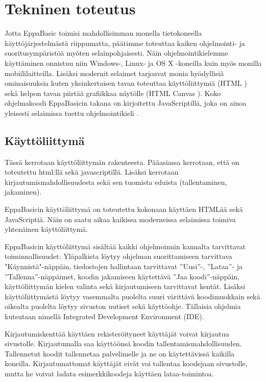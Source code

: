 
\section{Tekninen toteutus}

Jotta EppaBasic toimisi mahdollisimman monella tietokoneella käyttöjärjestelmästä riippumatta,
päätimme toteuttaa kaiken ohjelmointi- ja suoritusympäristöä myöten selainpohjaisesti.
Näin ohjelmointikielemme käyttäminen onnistuu niin Windows-, Linux- ja OS X -koneilla
kuin myös monilla mobiililaitteilla.
Lisäksi modernit selaimet tarjoavat monia hyödyllisiä ominaisuuksia
kuten yksinkertaisen tavan toteuttaa käyttöliittymiä (HTML \cite{w3c_html})
sekä helpon tavan piirtää grafiikkaa näytölle (HTML Canvas \cite{mdn_canvas}).
Koko ohjelmakoodi EppaBasicin takana on kirjoitettu JavaScriptillä,
joka on ainoa yleisesti selaimissa tuettu ohjelmointikieli \cite{mdn_about_js}.

\subsection{Käyttöliittymä}
\begin{anfxnote}{}
Tässä kerrotaan käyttöliittymän rakenteesta.
Pääasiassa kerrotaan, että on toteutettu html:llä sekä javascriptillä.
Lisäksi kerrotaan kirjautumismahdollisuudesta sekä
sen tuomista eduista (tallentaminen, jakaminen).
\end{anfxnote}

EppaBasicin käyttöliittymä on toteutettu kokonaan käyttäen HTMLää sekä JavaScriptiä.
Näin on saatu aikaa kaikissa moderneissa selaimissa toimiva yhtenäinen käyttöliittymä.

EppaBasicin käyttöliittymä sisältää kaikki ohjelmoinnin kannalta tarvittavat toiminnallisuudet:
Yläpalkista löytyy ohjelman suorittamiseen tarvittava "Käynnistä"-näppäin,
tiedostojen hallintaan tarvittavat ''Uusi''-, ''Lataa''- ja ''Tallenna''-näppäimet,
koodin jakamiseen käytettävä ''Jaa koodi''-näppäin,
käyttöliittymän kielen valinta
sekä kirjautumiseen tarvittavat kentät.
Lisäksi käyttöliittymästä löytyy vasemmalta puolelta suuri värittävä koodimuokkain
sekä oikealta puolelta löytyy sivuston uutiset sekä käyttöohje.
Tällaisia ohjelmia kutsutaan nimellä Integrated Development Environment (IDE).

Kirjautumiskenttää käyttäen rekisteröityneet käyttäjät voivat kirjautua sivustolle.
Kirjautumalla saa käyttöönsä koodin tallentamismahdollisuuden.
Tallennetut koodit tallennetaa palvelimelle
ja ne on käytettävissä kaikilla koneilla.
Kirjautumattomat käyttäjät eivät voi tallentaa koodejaan sivustolle,
mutta he voivat ladata esimerkkikoodeja käyttäen lataa-toimintoa.

